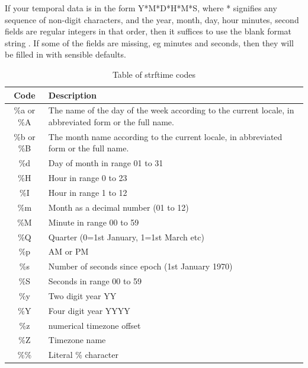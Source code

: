 If your temporal data is in the form Y*M*D*H*M*S, where * signifies
any sequence of non-digit characters, and the year, month, day, hour
minutes, second fields are regular integers in that order, then it
suffices to use the blank format string . If some of the fields are missing, eg minutes and seconds,
then they will be filled in with sensible defaults.

\begin{center}
\end{center}

\begin{table}
  \begin{tabular}{|c|l|}
    \hline Code & Description \\\hline
    \%a or \%A &  The name of the day of the week according to the current locale,
                 in abbreviated form or the full name.\\
    \%b or \%B &  The month name according to the current locale,  in  abbreviated
                 form or the full name.\\
    \%d & Day of month in range 01 to 31\\
    \%H & Hour in range 0 to 23\\
    \%I & Hour in range 1 to 12\\
    \%m & Month as a decimal number (01 to 12)\\
    \%M & Minute in range 00 to 59\\
    \%Q & Quarter (0=1st January, 1=1st March etc)\\
    \%p & AM or PM\\
    \%s & Number of seconds since epoch (1st January 1970)\\
    \%S & Seconds in range 00 to 59 \\
    \%y & Two digit year YY\\
    \%Y & Four digit year YYYY\\
    \%z & numerical timezone offset\\
    \%Z & Timezone name\\
    \%\% & Literal \% character\\
    \hline
  \end{tabular}
  \caption{Table of strftime codes}
  \label{Strftime code}
\end{table}

